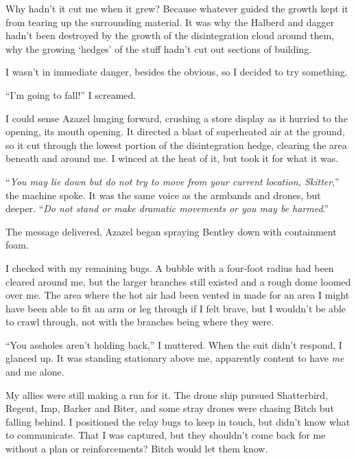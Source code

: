Why hadn't it cut me when it grew?  Because whatever guided the growth kept it from tearing up the surrounding material.  It was why the Halberd and dagger hadn't been destroyed by the growth of the disintegration cloud around them, why the growing `hedges' of the stuff hadn't cut out sections of building.



I wasn't in immediate danger, besides the obvious, so I decided to try something.



``I'm going to fall!'' I screamed.



I could sense Azazel lunging forward, crushing a store display as it hurried to the opening, its mouth opening.  It directed a blast of superheated air at the ground, so it cut through the lowest portion of the disintegration hedge, clearing the area beneath and around me.  I winced at the heat of it, but took it for what it was.



``\emph{You may lie down but do not try to move from your current location, Skitter},'' the machine spoke.  It was the same voice as the armbands and drones, but deeper.  ``\emph{Do not stand or make dramatic movements or you may be harmed}.''



The message delivered, Azazel began spraying Bentley down with containment foam.



I checked with my remaining bugs.  A bubble with a four-foot radius had been cleared around me, but the larger branches still existed and a rough dome loomed over me.  The area where the hot air had been vented in made for an area I might have been able to fit an arm or leg through if I felt brave, but I wouldn't be able to crawl through, not with the branches being where they were.



``You assholes aren't holding back,'' I muttered.  When the suit didn't respond, I glanced up.  It was standing stationary above me, apparently content to have \emph{me} and me alone.



My allies were still making a run for it.  The drone ship pursued Shatterbird, Regent, Imp, Barker and Biter, and some stray drones were chasing Bitch but falling behind.  I positioned the relay bugs to keep in touch, but didn't know what to communicate.  That I was captured, but they shouldn't come back for me without a plan or reinforcements?  Bitch would let them know.



